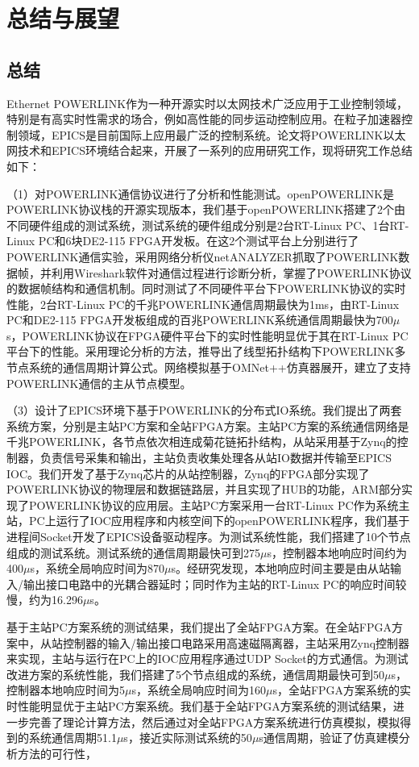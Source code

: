 
\chapter{总结与展望}

\section{总结}
Ethernet POWERLINK作为一种开源实时以太网技术广泛应用于工业控制领域，特别是有高实时性需求的场合，例如高性能的同步运动控制应用。在粒子加速器控制领域，EPICS是目前国际上应用最广泛的控制系统。论文将POWERLINK以太网技术和EPICS环境结合起来，开展了一系列的应用研究工作，现将研究工作总结如下：

（1）对POWERLINK通信协议进行了分析和性能测试。openPOWERLINK是POWERLINK协议栈的开源实现版本，我们基于openPOWERLINK搭建了2个由不同硬件组成的测试系统，测试系统的硬件组成分别是2台RT-Linux PC、1台RT-Linux PC和6块DE2-115 FPGA开发板。在这2个测试平台上分别进行了POWERLINK通信实验，采用网络分析仪netANALYZER抓取了POWERLINK数据帧，并利用Wireshark软件对通信过程进行诊断分析，掌握了POWERLINK协议的数据帧结构和通信机制。同时测试了不同硬件平台下POWERLINK协议的实时性能，2台RT-Linux PC的千兆POWERLINK通信周期最快为1ms，由RT-Linux PC和DE2-115 FPGA开发板组成的百兆POWERLINK系统通信周期最快为700$\mu$s，POWERLINK协议在FPGA硬件平台下的实时性能明显优于其在RT-Linux PC平台下的性能。采用理论分析的方法，推导出了线型拓扑结构下POWERLINK多节点系统的通信周期计算公式。网络模拟基于OMNet++仿真器展开，建立了支持POWERLINK通信的主从节点模型。

（3）设计了EPICS环境下基于POWERLINK的分布式IO系统。我们提出了两套系统方案，分别是主站PC方案和全站FPGA方案。主站PC方案的系统通信网络是千兆POWERLINK，各节点依次相连成菊花链拓扑结构，从站采用基于Zynq的控制器，负责信号采集和输出，主站负责收集处理各从站IO数据并传输至EPICS IOC。我们开发了基于Zynq芯片的从站控制器，Zynq的FPGA部分实现了POWERLINK协议的物理层和数据链路层，并且实现了HUB的功能，ARM部分实现了POWERLINK协议的应用层。主站PC方案采用一台RT-Linux PC作为系统主站，PC上运行了IOC应用程序和内核空间下的openPOWERLINK程序，我们基于进程间Socket开发了EPICS设备驱动程序。为测试系统性能，我们搭建了10个节点组成的测试系统。测试系统的通信周期最快可到275$\mu$s，控制器本地响应时间约为400$\mu$s，系统全局响应时间为870$\mu$s。经研究发现，本地响应时间主要是由从站输入/输出接口电路中的光耦合器延时；同时作为主站的RT-Linux PC的响应时间较慢，约为16.296$\mu$s。

基于主站PC方案系统的测试结果，我们提出了全站FPGA方案。在全站FPGA方案中，从站控制器的输入/输出接口电路采用高速磁隔离器，主站采用Zynq控制器来实现，主站与运行在PC上的IOC应用程序通过UDP Socket的方式通信。为测试改进方案的系统性能，我们搭建了5个节点组成的系统，通信周期最快可到50$\mu$s，控制器本地响应时间为5$\mu$s，系统全局响应时间为160$\mu$s，全站FPGA方案系统的实时性能明显优于主站PC方案系统。我们基于全站FPGA方案系统的测试结果，进一步完善了理论计算方法，然后通过对全站FPGA方案系统进行仿真模拟，模拟得到的系统通信周期51.1$\mu$s，接近实际测试系统的50$\mu$s通信周期，验证了仿真建模分析方法的可行性，



